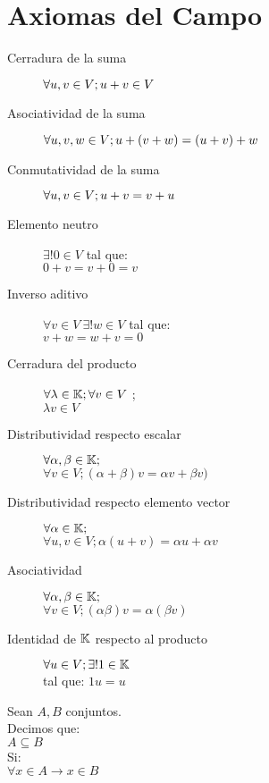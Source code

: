%
%
%
%
%

%


%
\section{Axiomas del Campo}
\begin{description}
	\item[Cerradura de la suma]$\forall u,v \in V;\\ u+v \in V$
	\item[Asociatividad de la suma]$\forall u,v,w \in V;\\ u+(v+w) = (u+v)+w $ 
	\item[Conmutatividad de la suma]$\forall u,v \in V;\\ u+v = v+u $
	\item[Elemento neutro]$\exists! 0 \in V$ tal que: \\ $  0 + v = v+0 = v $
	\item[Inverso aditivo]$\forall v \in V \  \exists! w \in V$ tal que: \\$ v + w = w + v = 0 $ 
	\item [Cerradura del producto] $\forall \lambda \in \mathbb{K};\forall v \in V$ ; \\ $\lambda v \in V$
	\item[Distributividad respecto escalar] $\forall \alpha , \beta \in \mathbb{K};$ \\ $\forall v \in V; (\alpha + \beta )v = \alpha v + \beta v)$
	\item [Distributividad respecto elemento vector] $\forall \alpha \in \mathbb{K};$ \\ $  \forall u,v \in V; \alpha (u+v)= \alpha u + \alpha v$  
	\item [Asociatividad] $\forall \alpha, \beta \in \mathbb{K};$ \\ $\forall v \in V; (\alpha\beta)v = \alpha(\beta v) $
	\item [Identidad de $\mathbb{K}$ respecto al producto]$\forall u \in V; \exists! 1 \in \mathbb{K}$\\ tal que:  $1u= u$
\end{description}	
\begin{defin}
Sean $A,B$ conjuntos.\\ Decimos que:\\
$A \subseteq B$ \\
Si: \\
$\forall x \in A \rightarrow x \in B$
\end{defin}

%
%

